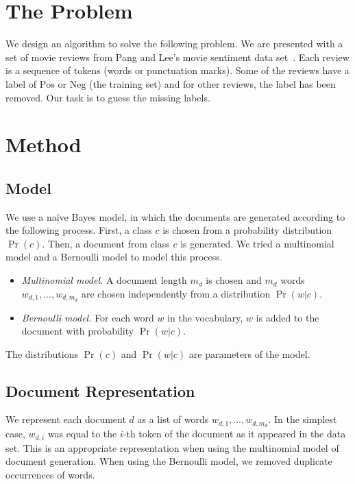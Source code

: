 \documentclass{article}
\newcommand{\PosC}{\mathrm{Pos}}
\newcommand{\NegC}{\mathrm{Neg}}
\begin{document}
\section{The Problem}

We design an algorithm to solve the following problem.
We are presented with a set of movie reviews from Pang and Lee's movie sentiment data set~\cite{Pang+Lee:04a}.
Each review is a sequence of tokens (words or punctuation marks).
Some of the reviews have a label of \(\PosC\) or \(\NegC\) (the training set) and for other reviews, the label has been removed.
Our task is to guess the missing labels.

\section{Method}

\subsection{Model}

We use a na\"ive Bayes model, in which the documents are generated according to the following process.
First, a class \(c\) is chosen from a probability distribution \(\Pr(c)\).
Then, a document from class \(c\) is generated.
We tried a multinomial model and a Bernoulli model to model this process.
\begin{itemize}
\item \emph{Multinomial model.}  A document length \(m_d\) is chosen and \(m_d\) words \(w_{d,1}, \dotsc, w_{d,m_d}\) are chosen independently from a distribution \(\Pr(w|c)\).
\item \emph{Bernoulli model.}  For each word \(w\) in the vocabulary, \(w\) is added to the document with probability \(\Pr(w|c)\).
\end{itemize}
The distributions \(\Pr(c)\) and \(\Pr(w|c)\) are parameters of the model.

\subsection{Document Representation}

We represent each document \(d\) as a list of words \(w_{d,1}, \dotsc, w_{d,m_d}\).
In the simplest case, \(w_{d,i}\) was equal to the \(i\)-th token of the document as it appeared in the data set.
This is an appropriate representation when using the multinomial model of document generation.
When using the Bernoulli model, we removed duplicate occurrences of words.
\end{document}
